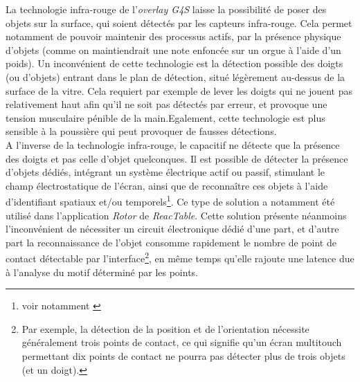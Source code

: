 \noindent La technologie infra-rouge de l'\textit{overlay G4S} laisse la possibilité de poser des objets sur la surface, qui soient détectés par les capteurs infra-rouge. Cela permet notamment de pouvoir maintenir des processus actifs, par la présence physique d'objets (comme on maintiendrait une note enfoncée sur un orgue à l'aide d'un poids). Un inconvénient de cette technologie est la détection possible des doigts (ou d'objets) entrant dans le plan de détection, situé légèrement au-dessus de la surface de la vitre. Cela requiert par exemple de lever les doigts qui ne jouent pas relativement haut afin qu'il ne soit pas détectés par erreur, et provoque une tension musculaire pénible de la main.Egalement, cette technologie est plus sensible à la poussière qui peut provoquer de fausses détections.\\
\indent A l'inverse de la technologie infra-rouge, le capacitif ne détecte que la présence des doigts et pas celle d'objet quelconques. Il est possible de détecter la présence d'objets dédiés, intégrant un système électrique actif ou passif, stimulant le champ électrostatique de l'écran, ainsi que de reconnaître ces objets à l'aide d'identifiant spatiaux et/ou temporels\footnote{voir notamment \cite{rekimoto_datatiles_2001, yu_tuic_2011}}. Ce type de solution a notamment été utilisé dans l'application \textit{Rotor} de \textit{ReacTable}. Cette solution présente néanmoins l'inconvénient de nécessiter un circuit électronique dédié d'une part, et d'autre part la reconnaissance de l'objet consomme rapidement le nombre de point de contact détectable par l'interface\footnote{Par exemple, la détection de la position et de l'orientation nécessite généralement trois points de contact, ce qui signifie qu'un écran multitouch permettant dix points de contact ne pourra pas détecter plus de trois objets (et un doigt).}, en même temps qu'elle rajoute une latence due à l'analyse du motif déterminé par les points.

